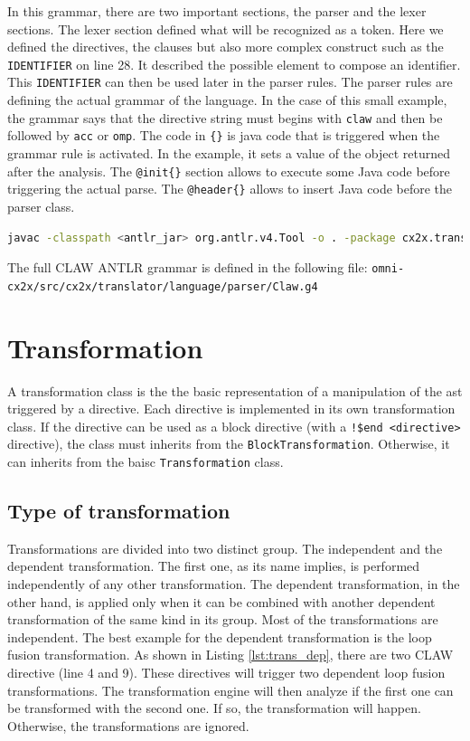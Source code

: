 \documentclass[a4paper, 11pt]{report}
\begin{document}
In this grammar, there are two important sections, the parser and the lexer 
sections. The lexer section defined what will be recognized as a token. Here 
we defined the directives, the clauses but also more complex construct such as 
the \lstinline|IDENTIFIER| on line 28. It described the possible element to 
compose an identifier. This \lstinline|IDENTIFIER| can then be used later in 
the parser rules. 
The parser rules are defining the actual grammar of the language. In the case 
of this small example, the grammar says that the directive string must begins 
with \lstinline|claw| and then be followed by \lstinline|acc| or 
\lstinline|omp|. The code in \lstinline|{}| is java code that is triggered 
when the grammar rule is activated. In the example, it sets a value of the 
object returned after the analysis.
The \lstinline|@init{}| section allows to execute some Java code before 
triggering the actual parse. The \lstinline|@header{}| allows to insert Java 
code before the parser class.

\begin{lstlisting}[label=lst:antlr_cmd, caption=ANTLR parser generation command, language=bash]
javac -classpath <antlr_jar> org.antlr.v4.Tool -o . -package cx2x.translator.language.parser Claw.g4
\end{lstlisting}

The full CLAW ANTLR grammar is defined in the following file: 
\lstinline|omni-cx2x/src/cx2x/translator/language/parser/Claw.g4|

\chapter{Transformation}
\label{chapter:transformation}
A transformation class is the the basic representation of a manipulation of the
\gls{ast} triggered by a directive. Each directive is implemented in its own 
transformation class. If the directive can be used as a block directive (with a
\lstinline|!$end <directive>| directive), the class must inherits from the 
\lstinline!BlockTransformation!. Otherwise, it can inherits from the baisc 
\lstinline!Transformation! class.

\section{Type of transformation}
Transformations are divided into two distinct group. The independent and the 
dependent transformation. The first one, as its name implies, is performed 
independently of any other transformation. The dependent transformation, in the
other hand, is applied only when it can be combined with another dependent 
transformation of the same kind in its group. Most of the transformations are 
independent. The best example for the dependent transformation is the loop 
fusion transformation. As shown in Listing \ref{lst:trans_dep}, there are two 
CLAW directive (line 4 and 9). These directives will trigger two dependent loop
fusion transformations. The transformation engine will then analyze if the 
first one can be transformed with the second one. If so, the transformation 
will happen. Otherwise, the transformations are ignored.
\end{document}
